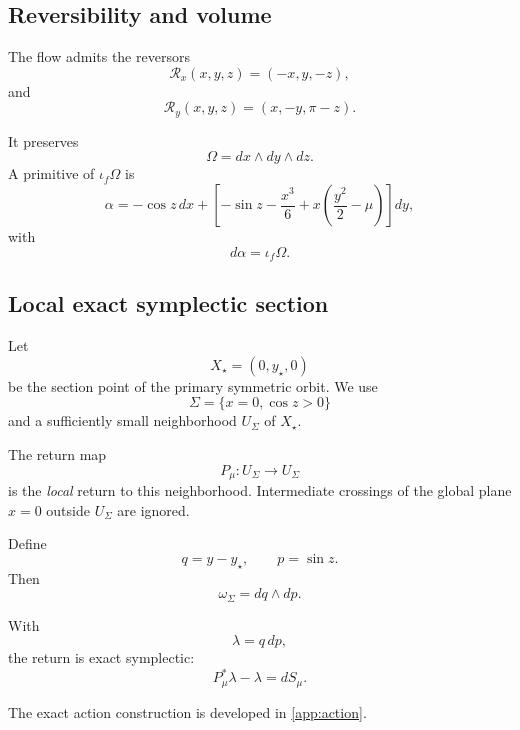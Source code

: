 \subsection{Reversibility and volume}

The flow admits the reversors
\[
\mathcal R_x(x,y,z)=(-x,y,-z),
\]
and
\[
\mathcal R_y(x,y,z)=(x,-y,\pi-z).
\]

It preserves
\[
\Omega=dx\wedge dy\wedge dz.
\]
A primitive of \(\iota_f\Omega\) is
\[
\alpha
=
-\cos z\,dx+
\left[
-\sin z-\frac{x^3}{6}
+x\left(\frac{y^2}{2}-\mu\right)
\right]dy,
\]
with
\[
d\alpha=\iota_f\Omega.
\]

\subsection{Local exact symplectic section}

Let
\[
X_\star=(0,y_\star,0)
\]
be the section point of the primary symmetric orbit. We use
\[
\Sigma=\{x=0,\cos z>0\}
\]
and a sufficiently small neighborhood \(U_\Sigma\) of \(X_\star\).

The return map
\[
P_\mu:U_\Sigma\to U_\Sigma
\]
is the \emph{local} return to this neighborhood. Intermediate crossings of the global plane \(x=0\) outside \(U_\Sigma\) are ignored.

Define
\begin{equation}
\boxed{
q=y-y_\star,\qquad p=\sin z.
}
\label{eq:exact-darboux}
\end{equation}
Then
\[
\omega_\Sigma=dq\wedge dp.
\]

With
\[
\lambda=q\,dp,
\]
the return is exact symplectic:
\begin{equation}
\boxed{
P_\mu^*\lambda-\lambda=dS_\mu.
}
\label{eq:return-exact}
\end{equation}

The exact action construction is developed in \cref{app:action}.
